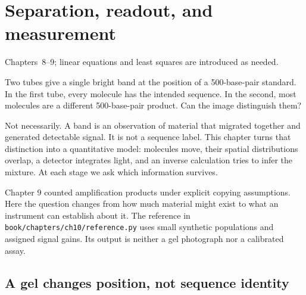 \chapter{Separation, readout, and measurement}
\label{ch:readout}
{Chapters~8--9; linear equations and least squares are introduced as needed.}

Two tubes give a single bright band at the position of a 500-base-pair standard. In the first tube, every molecule has the intended sequence. In the second, most molecules are a different 500-base-pair product. Can the image distinguish them?

Not necessarily. A band is an observation of material that migrated together and generated detectable signal. It is not a sequence label. This chapter turns that distinction into a quantitative model: molecules move, their spatial distributions overlap, a detector integrates light, and an inverse calculation tries to infer the mixture. At each stage we ask which information survives.

Chapter 9 counted amplification products under explicit copying assumptions. Here the question changes from how much material might exist to what an instrument can establish about it. The reference in \texttt{book/chapters/ch10/reference.py} uses small synthetic populations and assigned signal gains. Its output is neither a gel photograph nor a calibrated assay.

\section{A gel changes position, not sequence identity}


